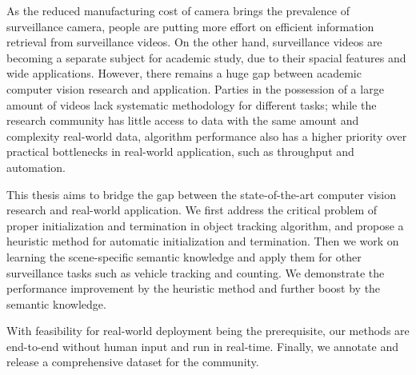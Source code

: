 \summary

As the reduced manufacturing cost of camera brings the prevalence of surveillance camera, people are putting more effort on efficient information retrieval from surveillance videos.
On the other hand, surveillance videos are becoming a separate subject for academic study, due to their spacial features and wide applications.
However, there remains a huge gap between academic computer vision research and application. 
Parties in the possession of a large amount of videos lack systematic methodology for different tasks;
while the research community has little access to data with the same amount and complexity real-world data, algorithm performance also has a higher priority over practical bottlenecks in real-world application, such as throughput and automation.

This thesis aims to bridge the gap between the state-of-the-art computer vision research and real-world application.
We first address the critical problem of proper initialization and termination in object tracking algorithm, and propose a heuristic method for automatic initialization and termination.
Then we work on learning the scene-specific semantic knowledge and apply them for other surveillance tasks such as vehicle tracking and counting.
We demonstrate the performance improvement by the heuristic method and further boost by the semantic knowledge.

With feasibility for real-world deployment being the prerequisite, our methods are end-to-end without human input and run in real-time. 
Finally, we annotate and release a comprehensive dataset for the community. 